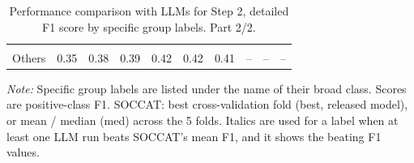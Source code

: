 \begin{table}[htb]
\begin{threeparttable}
\begin{tabular}{l c c c c c c c c c}
\shortstack[l]{\textbf{Others}\\[3pt]Others} & 0.35 & 0.38 & 0.39 & 0.42 & 0.42 & 0.41 & -- & -- & -- \\
\bottomrule
\end{tabular}
\begin{tablenotes}[flushleft]
\footnotesize
\item \textit{Note:} Specific group labels are listed under the name of their broad class. Scores are positive-class F1. SOCCAT: best cross-validation fold (best, released model), or mean / median (med) across the 5 folds. Italics are used for a label when at least one LLM run beats SOCCAT's mean F1, and it shows the beating F1 values.
\end{tablenotes}
\end{threeparttable}
\caption{Performance comparison with LLMs for Step 2, detailed F1 score by specific group labels. Part 2/2.}
\label{tab:llm-step2-2}
\end{table}
